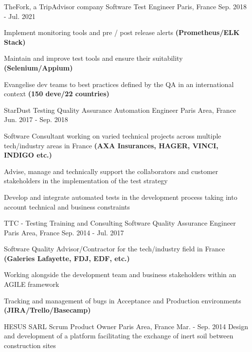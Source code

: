\begin{cventries}
  \cventry
  {TheFork, a TripAdvisor company }
  {Software Test Engineer}
  {Paris, France}
  {Sep. 2018 - Jul. 2021}
  {
    \begin{cvitems}
      \item{Implement monitoring tools and pre / post release alerts \textbf{(Prometheus/ELK Stack)}}
      \item{Maintain and improve test tools and ensure their suitability \textbf{(Selenium/Appium)}}
      \item{Evangelise dev teams to best practices defined by the QA in an international context \textbf{(150 deve/22 countries)}}
    \end{cvitems}
    \vspace{0.75em}
  }

  \cventry
  {StarDust Testing }
  {Quality Assurance Automation Engineer}
  {Paris Area, France}
  {Jun. 2017 - Sep. 2018}
  {
    \begin{cvitems}
      \item{Software Consultant working on varied technical projects across multiple tech/industry areas in France \textbf{(AXA Insurances, HAGER, VINCI, INDIGO etc.)}}
      \item{Advise, manage and technically support the collaborators and customer stakeholders in the implementation of the test strategy}
      \item{Develop and integrate automated tests in the development process taking into account technical and business constraints}
    \end{cvitems}
    \vspace{0.75em}
  }

  \cventry
  {TTC - Testing Training and Consulting }
  {Software Quality Assurance Engineer}
  {Paris Area, France}
  {Sep. 2014 - Jul. 2017}
  {
    \begin{cvitems}
      \item{Software Quality Advisor/Contractor for the tech/industry field in France \textbf{(Galeries Lafayette, FDJ, EDF, etc.)}}
      \item{Working alongside the development team and business stakeholders within an AGILE framework}
      \item {Tracking and management of bugs in Acceptance and Production environments \textbf{(JIRA/Trello/Basecamp)}}
    \end{cvitems}
    \vspace{0.75em}
  }

  \cventry
  {HESUS SARL }
  {Scrum Product Owner}
  {Paris Area, France}
  {Mar. - Sep. 2014}
  {Design and development of a platform facilitating the exchange of inert soil between construction sites \vspace{0.75em}}

\end{cventries}
